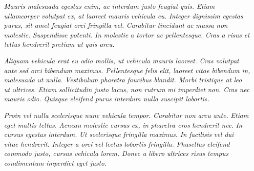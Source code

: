 \newpage
%	
\begin{dedicatoria}
\vspace*{\fill}
\centering
\noindent
\textit{Mauris malesuada egestas enim, ac interdum justo feugiat quis. Etiam ullamcorper volutpat ex, at laoreet mauris vehicula eu. Integer dignissim egestas purus, sit amet feugiat orci fringilla vel. Curabitur tincidunt ac massa non molestie. Suspendisse potenti. In molestie a tortor ac pellentesque. Cras a risus et tellus hendrerit pretium ut quis arcu.}

\textit{Aliquam vehicula erat eu odio mollis, ut vehicula mauris laoreet. Cras volutpat ante sed orci bibendum maximus. Pellentesque felis elit, laoreet vitae bibendum in, malesuada ut nulla. Vestibulum pharetra faucibus blandit. Morbi tristique at leo ut ultrices. Etiam sollicitudin justo lacus, non rutrum mi imperdiet non. Cras nec mauris odio. Quisque eleifend purus interdum nulla suscipit lobortis.}

\textit{Proin vel nulla scelerisque nunc vehicula tempor. Curabitur non arcu ante. Etiam eget mattis tellus. Aenean molestie cursus ex, in pharetra eros hendrerit nec. In cursus egestas interdum. Ut scelerisque fringilla maximus. In facilisis vel dui vitae hendrerit. Integer a orci vel lectus lobortis fringilla. Phasellus eleifend commodo justo, cursus vehicula lorem. Donec a libero ultrices risus tempus condimentum imperdiet eget justo. 
}

\vspace*{\fill}
\end{dedicatoria}
